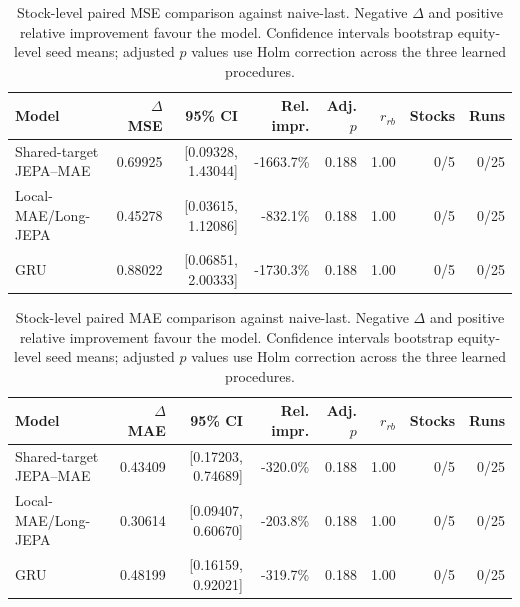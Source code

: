 \begin{table}[t]
\centering
\small
\caption{Stock-level paired MSE comparison against naive-last. Negative $\Delta$ and positive relative improvement favour the model. Confidence intervals bootstrap equity-level seed means; adjusted $p$ values use Holm correction across the three learned procedures.}
\label{tab:paired_mse_naive}
\begin{tabular}{lrrrrrrr}
\toprule
Model & $\Delta$MSE & 95\% CI & Rel. impr. & Adj. $p$ & $r_{rb}$ & Stocks & Runs \\
\midrule
Shared-target JEPA--MAE & 0.69925 & [0.09328, 1.43044] & -1663.7\% & 0.188 & 1.00 & 0/5 & 0/25 \\
Local-MAE/Long-JEPA & 0.45278 & [0.03615, 1.12086] & -832.1\% & 0.188 & 1.00 & 0/5 & 0/25 \\
GRU & 0.88022 & [0.06851, 2.00333] & -1730.3\% & 0.188 & 1.00 & 0/5 & 0/25 \\
\bottomrule
\end{tabular}
\end{table}

\begin{table}[t]
\centering
\small
\caption{Stock-level paired MAE comparison against naive-last. Negative $\Delta$ and positive relative improvement favour the model. Confidence intervals bootstrap equity-level seed means; adjusted $p$ values use Holm correction across the three learned procedures.}
\label{tab:paired_mae_naive}
\begin{tabular}{lrrrrrrr}
\toprule
Model & $\Delta$MAE & 95\% CI & Rel. impr. & Adj. $p$ & $r_{rb}$ & Stocks & Runs \\
\midrule
Shared-target JEPA--MAE & 0.43409 & [0.17203, 0.74689] & -320.0\% & 0.188 & 1.00 & 0/5 & 0/25 \\
Local-MAE/Long-JEPA & 0.30614 & [0.09407, 0.60670] & -203.8\% & 0.188 & 1.00 & 0/5 & 0/25 \\
GRU & 0.48199 & [0.16159, 0.92021] & -319.7\% & 0.188 & 1.00 & 0/5 & 0/25 \\
\bottomrule
\end{tabular}
\end{table}
